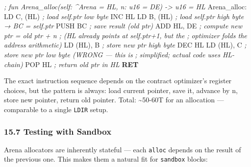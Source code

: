 \documentclass[
  11pt,
]{article}
\newenvironment{Shaded}{}{}
\newcommand{\BuiltInTok}[1]{\textcolor[rgb]{0.00,0.50,0.00}{#1}}
\newcommand{\CommentTok}[1]{\textcolor[rgb]{0.38,0.63,0.69}{\textit{#1}}}
\newcommand{\ControlFlowTok}[1]{\textcolor[rgb]{0.00,0.44,0.13}{\textbf{#1}}}
\newcommand{\FunctionTok}[1]{\textcolor[rgb]{0.02,0.16,0.49}{#1}}
\newcommand{\NormalTok}[1]{#1}
\newcommand{\OperatorTok}[1]{\textcolor[rgb]{0.40,0.40,0.40}{#1}}
\begin{document}
\begin{Shaded}
\begin{Highlighting}[]
\CommentTok{; fun Arena\_alloc(self: \^{}Arena = HL, n: u16 = DE) {-}\textgreater{} u16 = HL}
\FunctionTok{Arena\_alloc:}
\NormalTok{    LD C}\OperatorTok{,} \OperatorTok{(}\NormalTok{HL}\OperatorTok{)}          \CommentTok{; load self.ptr low byte}
    \BuiltInTok{INC}\NormalTok{ HL}
\NormalTok{    LD B}\OperatorTok{,} \OperatorTok{(}\NormalTok{HL}\OperatorTok{)}          \CommentTok{; load self.ptr high byte → BC = self.ptr}
    \BuiltInTok{PUSH}\NormalTok{ BC             }\CommentTok{; save result (old ptr)}
    \BuiltInTok{ADD}\NormalTok{ HL}\OperatorTok{,}\NormalTok{ DE          }\CommentTok{; compute new ptr = old ptr + n}
                        \CommentTok{; (HL already points at self.ptr+1, but the}
                        \CommentTok{;  optimizer folds the address arithmetic)}
\NormalTok{    LD }\OperatorTok{(}\NormalTok{HL}\OperatorTok{),}\NormalTok{ B          }\CommentTok{; store new ptr high byte}
    \BuiltInTok{DEC}\NormalTok{ HL}
\NormalTok{    LD }\OperatorTok{(}\NormalTok{HL}\OperatorTok{),}\NormalTok{ C          }\CommentTok{; store new ptr low byte  (WRONG — this is}
                        \CommentTok{;  simplified; actual code uses HL{-}chain)}
    \BuiltInTok{POP}\NormalTok{ HL              }\CommentTok{; return old ptr in HL}
    \ControlFlowTok{RET}
\end{Highlighting}
\end{Shaded}

The exact instruction sequence depends on the contract optimizer's
register choices, but the pattern is always: load current pointer, save
it, advance by n, store new pointer, return old pointer. Total:
\textasciitilde50-60T for an allocation --- comparable to a single
\texttt{LDIR} setup.

\subsubsection{15.7 Testing with Sandbox}\label{testing-with-sandbox}

Arena allocators are inherently stateful --- each \texttt{alloc} depends
on the result of the previous one. This makes them a natural fit for
\texttt{sandbox} blocks:
\end{document}
